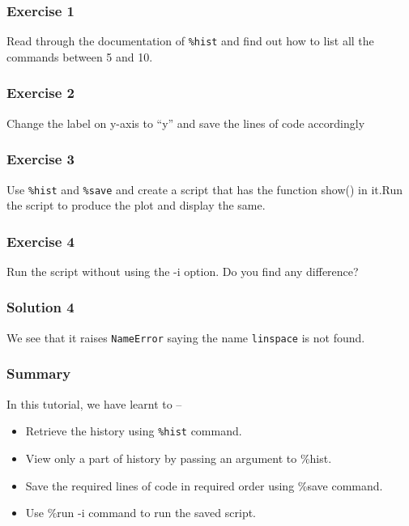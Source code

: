 \documentclass[presentation]{beamer}
\begin{document}
\begin{frame}
\frametitle{Exercise 1}
\label{sec-4}

  Read through the documentation of \texttt{\%hist} and find out how to
  list all the commands between 5 and 10.
\end{frame}
\begin{frame}
\frametitle{Exercise 2}
\label{sec-5}

  Change the label on y-axis to ``y'' and save the lines of code
  accordingly
\end{frame}
\begin{frame}
\frametitle{Exercise 3}
\label{sec-6}

  Use \texttt{\%hist} and \texttt{\%save} and create a script that has the function show()
  in it.Run the script to produce the plot and display the same.
\end{frame}
\begin{frame}
\frametitle{Exercise 4}
\label{sec-7}

  Run the script without using the -i option. Do you find any
  difference?
\end{frame}
\begin{frame}
\frametitle{Solution 4}
\label{sec-8}

  We see that it raises \verb~NameError~ saying the name \verb~linspace~ is not
  found.
\end{frame}
\begin{frame}
\frametitle{Summary}
\label{sec-9}

  In this tutorial, we have learnt to –

\begin{itemize}
\item Retrieve the history using \texttt{\%hist} command.
\item View only a part of history by passing an argument to \%hist.
\item Save the required lines of code in required order using \%save command.
\item Use \%run -i command to run the saved script.
\end{itemize}
\end{frame}
\end{document}
